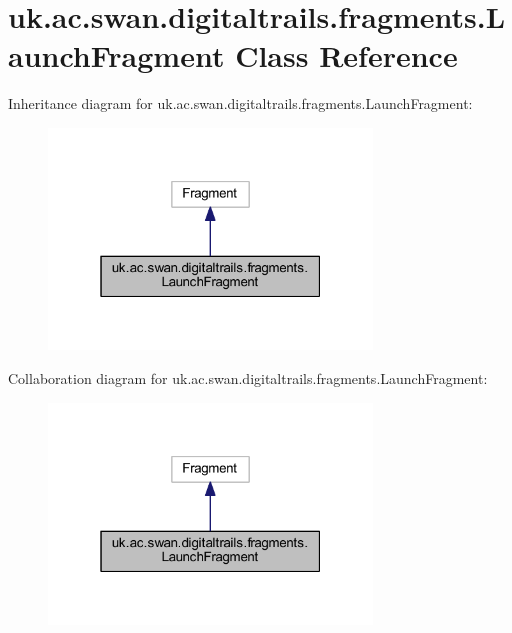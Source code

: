 \hypertarget{classuk_1_1ac_1_1swan_1_1digitaltrails_1_1fragments_1_1_launch_fragment}{\section{uk.\+ac.\+swan.\+digitaltrails.\+fragments.\+Launch\+Fragment Class Reference}
\label{classuk_1_1ac_1_1swan_1_1digitaltrails_1_1fragments_1_1_launch_fragment}
}


Inheritance diagram for uk.\+ac.\+swan.\+digitaltrails.\+fragments.\+Launch\+Fragment\+:\nopagebreak
\begin{figure}[H]
\begin{center}
\leavevmode
\includegraphics[width=244pt]{classuk_1_1ac_1_1swan_1_1digitaltrails_1_1fragments_1_1_launch_fragment__inherit__graph}
\end{center}
\end{figure}


Collaboration diagram for uk.\+ac.\+swan.\+digitaltrails.\+fragments.\+Launch\+Fragment\+:\nopagebreak
\begin{figure}[H]
\begin{center}
\leavevmode
\includegraphics[width=244pt]{classuk_1_1ac_1_1swan_1_1digitaltrails_1_1fragments_1_1_launch_fragment__coll__graph}
\end{center}
\end{figure}
